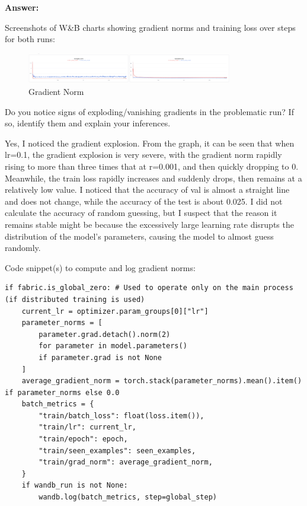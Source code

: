 \documentclass[11pt, oneside]{article}   	%
\begin{document}
\begin{answerbox} \textbf{Answer:} \vspace*{1cm}

Screenshots of W\&B charts showing gradient norms and training loss over steps for both runs:

\begin{figure}[h]
    \centering
    \includegraphics[width=0.8\textwidth]{images/grad_norm.png}
    \caption{Gradient Norm}
\end{figure}

Do you notice signs of exploding/vanishing gradients in the problematic run? If so, identify them and explain your inferences.

Yes, I noticed the gradient explosion. From the graph, it can be seen that when lr=0.1, the gradient explosion is very severe, with the gradient norm rapidly rising to more than three times that at r=0.001, and then quickly dropping to 0. Meanwhile, the train loss rapidly increases and suddenly drops, then remains at a relatively low value. I noticed that the accuracy of val is almost a straight line and does not change, while the accuracy of the test is about 0.025. I did not calculate the accuracy of random guessing, but I suspect that the reason it remains stable might be because the excessively large learning rate disrupts the distribution of the model's parameters, causing the model to almost guess randomly.

Code snippet(s) to compute and log gradient norms:

\begin{verbatim}
if fabric.is_global_zero: # Used to operate only on the main process (if distributed training is used)
    current_lr = optimizer.param_groups[0]["lr"]
    parameter_norms = [
        parameter.grad.detach().norm(2)
        for parameter in model.parameters()
        if parameter.grad is not None
    ]
    average_gradient_norm = torch.stack(parameter_norms).mean().item() if parameter_norms else 0.0
    batch_metrics = {
        "train/batch_loss": float(loss.item()),
        "train/lr": current_lr,
        "train/epoch": epoch,
        "train/seen_examples": seen_examples,
        "train/grad_norm": average_gradient_norm,
    }
    if wandb_run is not None:
        wandb.log(batch_metrics, step=global_step)
\end{verbatim}

\end{answerbox}
\end{document}
